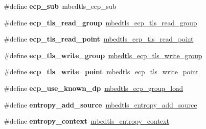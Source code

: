 \begin{DoxyCompactItemize}
\item 
\mbox{\label{compat-1_83_8h_aa03f07c4496f54a99c0d171d004c1651}} 
\#define {\bfseries ecp\+\_\+sub}~mbedtls\+\_\+ecp\+\_\+sub
\item 
\mbox{\label{compat-1_83_8h_a9ef691874d0edc09871af3828effc6f3}} 
\#define {\bfseries ecp\+\_\+tls\+\_\+read\+\_\+group}~\mbox{\hyperlink{ecp_8h_acfd0cdb926358713b31c48b2e4dd9e58}{mbedtls\+\_\+ecp\+\_\+tls\+\_\+read\+\_\+group}}
\item 
\mbox{\label{compat-1_83_8h_ad361a6b042cfa61252e209096d7f0da2}} 
\#define {\bfseries ecp\+\_\+tls\+\_\+read\+\_\+point}~\mbox{\hyperlink{ecp_8h_a883eb26a1be64c491ea0354189ae2604}{mbedtls\+\_\+ecp\+\_\+tls\+\_\+read\+\_\+point}}
\item 
\mbox{\label{compat-1_83_8h_ab02c3a2ece1f2c9d5eba2acefb388866}} 
\#define {\bfseries ecp\+\_\+tls\+\_\+write\+\_\+group}~\mbox{\hyperlink{ecp_8h_a2ae23f66900fe6f3ef50eb30af4143d0}{mbedtls\+\_\+ecp\+\_\+tls\+\_\+write\+\_\+group}}
\item 
\mbox{\label{compat-1_83_8h_ad26b20f5dbb94d9ced157a6fad77ef6e}} 
\#define {\bfseries ecp\+\_\+tls\+\_\+write\+\_\+point}~\mbox{\hyperlink{ecp_8h_aa98adfe68b926724607d8fcab61397a9}{mbedtls\+\_\+ecp\+\_\+tls\+\_\+write\+\_\+point}}
\item 
\mbox{\label{compat-1_83_8h_a07bc8def1310a4349c62aa8074fc2be7}} 
\#define {\bfseries ecp\+\_\+use\+\_\+known\+\_\+dp}~\mbox{\hyperlink{ecp_8h_aa0fa8e161975dc31f819b5859016863e}{mbedtls\+\_\+ecp\+\_\+group\+\_\+load}}
\item 
\mbox{\label{compat-1_83_8h_a7b560445b0d88de4da5458c97d657d3e}} 
\#define {\bfseries entropy\+\_\+add\+\_\+source}~\mbox{\hyperlink{entropy_8h_ad1bf424d076142e9aeec9e68207f5aaa}{mbedtls\+\_\+entropy\+\_\+add\+\_\+source}}
\item 
\mbox{\label{compat-1_83_8h_a1660b9eef831ffa41b3df419a819f953}} 
\#define {\bfseries entropy\+\_\+context}~\mbox{\hyperlink{structmbedtls__entropy__context}{mbedtls\+\_\+entropy\+\_\+context}}
\item 
\mbox{\label{compat-1_83_8h_acd19ba9b94f7bcac39265496d10794a2}} 

\end{DoxyCompactItemize}
